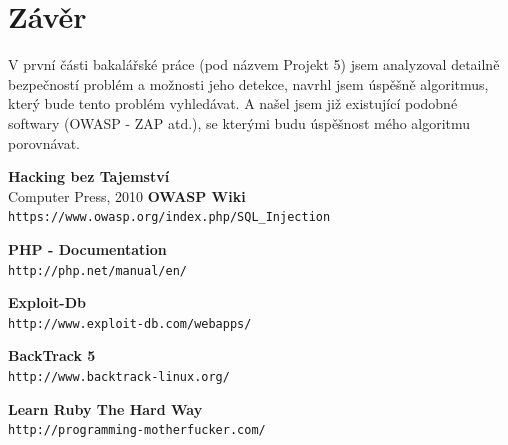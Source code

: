 \documentclass[12pt, a4paper]{report}
\begin{document}
\chapter{Závěr}
V první části bakalářské práce (pod názvem Projekt 5) jsem analyzoval detailně bezpečností problém a možnosti jeho detekce, navrhl jsem úspěšně algoritmus, který bude tento problém vyhledávat. A našel jsem již existující podobné softwary (OWASP - ZAP  atd.), se kterými budu úspěšnost mého algoritmu porovnávat.

\begin{thebibliography}{9}
               {\bf Hacking bez Tajemství} \\
           Computer Press, 2010
	{\bf OWASP Wiki} \\
	\texttt{https://www.owasp.org/index.php/SQL\_Injection}

	{\bf PHP - Documentation}\\
	\texttt{http://php.net/manual/en/}

	{\bf Exploit-Db}\\
	\texttt{http://www.exploit-db.com/webapps/}

 {\bf BackTrack 5}\\
	\texttt{http://www.backtrack-linux.org/}

 {\bf Learn Ruby The Hard Way}\\
	\texttt{http://programming-motherfucker.com/}

\end{thebibliography}
\end{document}
